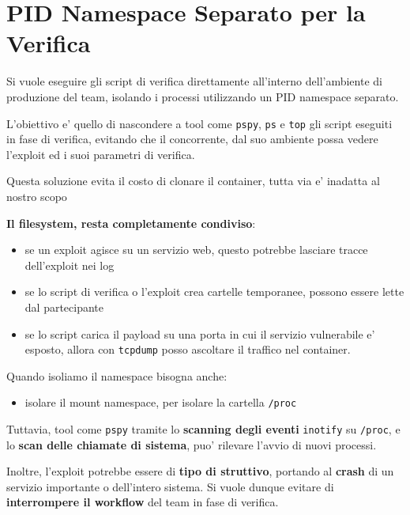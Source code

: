 \section{PID Namespace Separato per la
Verifica}\label{pid-namespace-separato-per-la-verifica}

Si vuole eseguire gli script di verifica direttamente all'interno
dell'ambiente di produzione del team, isolando i processi utilizzando un
PID namespace separato.

L'obiettivo e' quello di nascondere a tool come
\passthrough{\lstinline!pspy!}, \passthrough{\lstinline!ps!} e
\passthrough{\lstinline!top!} gli script eseguiti in fase di verifica,
evitando che il concorrente, dal suo ambiente possa vedere l'exploit ed
i suoi parametri di verifica.

Questa soluzione evita il costo di clonare il container, tutta via e'
inadatta al nostro scopo

\textbf{Il filesystem, resta completamente condiviso}:

\begin{itemize}
\tightlist
\item
  se un exploit agisce su un servizio web, questo potrebbe lasciare
  tracce dell'exploit nei log
\item
  se lo script di verifica o l'exploit crea cartelle temporanee, possono
  essere lette dal partecipante
\item
  se lo script carica il payload su una porta in cui il servizio
  vulnerabile e' esposto, allora con \passthrough{\lstinline!tcpdump!}
  posso ascoltare il traffico nel container.
\end{itemize}

Quando isoliamo il namespace bisogna anche:

\begin{itemize}
\tightlist
\item
  isolare il mount namespace, per isolare la cartella
  \passthrough{\lstinline!/proc!}
\end{itemize}

Tuttavia, tool come \passthrough{\lstinline!pspy!} tramite lo
\textbf{scanning degli eventi} \passthrough{\lstinline!inotify!} su
\passthrough{\lstinline!/proc!}, e lo \textbf{scan delle chiamate di
sistema}, puo' rilevare l'avvio di nuovi processi.

Inoltre, l'exploit potrebbe essere di \textbf{tipo di struttivo},
portando al \textbf{crash} di un servizio importante o dell'intero
sistema. Si vuole dunque evitare di \textbf{interrompere il workflow}
del team in fase di verifica.

